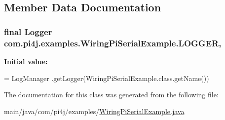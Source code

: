 \subsection{Member Data Documentation}
\hypertarget{classcom_1_1pi4j_1_1examples_1_1WiringPiSerialExample_a335f823a3888fcd85f48ecc57b1eb490}{}
\subsubsection[{L\+O\+G\+G\+E\+R}]{\setlength{\rightskip}{0pt plus 5cm}final Logger com.\+pi4j.\+examples.\+Wiring\+Pi\+Serial\+Example.\+L\+O\+G\+G\+E\+R\hspace{0.3cm}{\ttfamily [static]}, {\ttfamily [private]}}\label{classcom_1_1pi4j_1_1examples_1_1WiringPiSerialExample_a335f823a3888fcd85f48ecc57b1eb490}
{\bfseries Initial value\+:}
\begin{DoxyCode}
= LogManager
            .getLogger(WiringPiSerialExample.class.getName())
\end{DoxyCode}


The documentation for this class was generated from the following file\+:\begin{DoxyCompactItemize}
\item 
main/java/com/pi4j/examples/\hyperlink{WiringPiSerialExample_8java}{Wiring\+Pi\+Serial\+Example.\+java}\end{DoxyCompactItemize}
